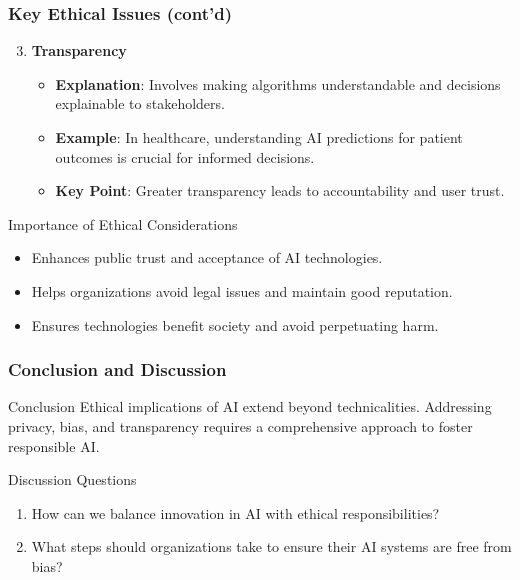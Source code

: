 \documentclass[aspectratio=169]{beamer}
\begin{document}
\begin{frame}[fragile]
    \frametitle{Key Ethical Issues (cont'd)}
    \begin{enumerate}
        \setcounter{enumi}{2} %
        \item \textbf{Transparency}
        \begin{itemize}
            \item \textbf{Explanation}: Involves making algorithms understandable and decisions explainable to stakeholders.
            \item \textbf{Example}: In healthcare, understanding AI predictions for patient outcomes is crucial for informed decisions.
            \item \textbf{Key Point}: Greater transparency leads to accountability and user trust.
        \end{itemize}
    \end{enumerate}
    
    \begin{block}{Importance of Ethical Considerations}
        \begin{itemize}
            \item Enhances public trust and acceptance of AI technologies.
            \item Helps organizations avoid legal issues and maintain good reputation.
            \item Ensures technologies benefit society and avoid perpetuating harm.
        \end{itemize}
    \end{block}
\end{frame}

\begin{frame}[fragile]
    \frametitle{Conclusion and Discussion}
    \begin{block}{Conclusion}
        Ethical implications of AI extend beyond technicalities. Addressing privacy, bias, and transparency requires a comprehensive approach to foster responsible AI.
    \end{block}

    \begin{block}{Discussion Questions}
        \begin{enumerate}
            \item How can we balance innovation in AI with ethical responsibilities?
            \item What steps should organizations take to ensure their AI systems are free from bias?
        \end{enumerate}
    \end{block}
\end{frame}
\end{document}
